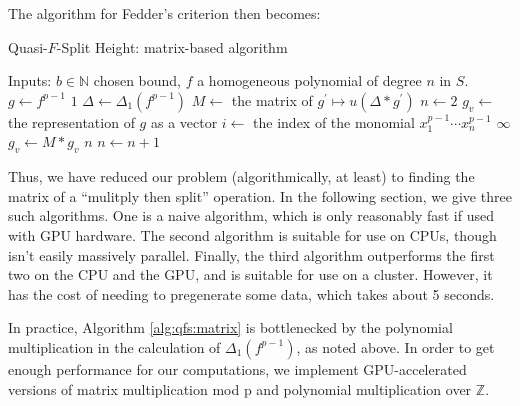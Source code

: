 The algorithm for Fedder's criterion then becomes:

\begin{algorithm}[h]
\caption{Quasi-\(F\)-Split Height: matrix-based algorithm}
\label{alg:qfs:matrix}
\begin{algorithmic}[1]
\State Inputs: \(b \in \mathbb{N}\) chosen bound, \(f\) a homogeneous
	polynomial of degree \(n\) in \(S\).
\State \(g \gets f^{p-1}\) 
    \State \Return \(1\) 
\EndIf
\State \(\Delta \gets \Delta_{1}(f^{p-1})\) 
\State \(M \gets\) the matrix of  \(g^{\prime} \mapsto u(\Delta * g^{\prime})\)
\State \(n \gets 2\) 
\State \(g_{v} \gets\) the representation of \(g\) as a vector
\State \(i \gets \) the index of the monomial \(x_{1}^{p-1}\cdots x_{n}^{p-1}\)
        \State \Return \(\infty\)
    \EndIf
    \State \(g_{v} \gets M * g_{v}\) 
        \State \Return \(n\) 
    \EndIf
    \State \(n \gets n + 1\)
\EndWhile
\end{algorithmic}
\end{algorithm}

Thus, we have reduced our problem (algorithmically, at least)
to finding the matrix of a ``mulitply then split'' operation.
In the following section, we give three such algorithms.
One is a naive algorithm, which is only 
reasonably fast if used with GPU hardware. 
The second algorithm is suitable for use on CPUs,
though isn't easily massively parallel.
Finally, the third algorithm 
outperforms the first two on the CPU and the GPU,
and is suitable for use on a cluster. 
However, it has the cost of needing to pregenerate some
data, which takes about 5 seconds.

In practice, Algorithm \ref{alg:qfs:matrix} is bottlenecked
by the polynomial multiplication in the calculation of 
\(\Delta_{1}(f^{p-1})\), as noted above. 
In order to get enough performance for our computations,
we implement GPU-accelerated versions of
matrix multiplication mod p and polynomial multiplication
over \(\mathbb{Z}\).

